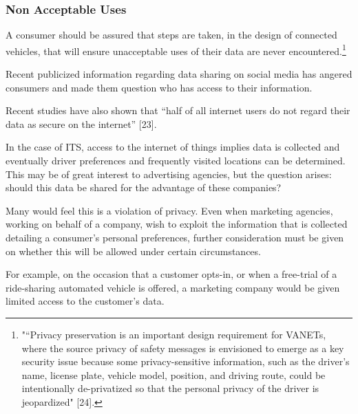 \documentclass[conference,compsoc]{IEEEtran}
\begin{document}
\subsubsection{Non Acceptable Uses}
A consumer should be assured that steps are taken, in the design of connected vehicles, that will ensure unacceptable uses of their data are never encountered.\footnote{"“Privacy preservation is an important design requirement for VANETs, where the source privacy of safety messages is envisioned to emerge as a key security issue because some privacy-sensitive information, such as the driver’s name, license plate, vehicle model, position, and driving route, could be intentionally de-privatized so that the personal privacy of the driver is jeopardized" [24].}

Recent publicized information regarding data sharing on social media has angered consumers and made them question who has access to their information. 

Recent studies have also shown that “half of all internet users do not regard their data as secure on the internet” [23]. 

In the case of ITS, access to the internet of things implies data is collected and eventually driver preferences and frequently visited locations can be determined. This may be of great interest to advertising agencies, but the question arises: should this data be shared for the advantage of these companies? 

Many would feel this is a violation of privacy. Even when marketing agencies, working on behalf of a company, wish to exploit the information that is collected detailing a consumer’s personal preferences, further consideration must be given on whether this will be allowed under certain circumstances. 

For example, on the occasion that a customer opts-in, or when a free-trial of a ride-sharing automated vehicle is offered, a marketing company would be given limited access to the customer’s data.
\end{document}
